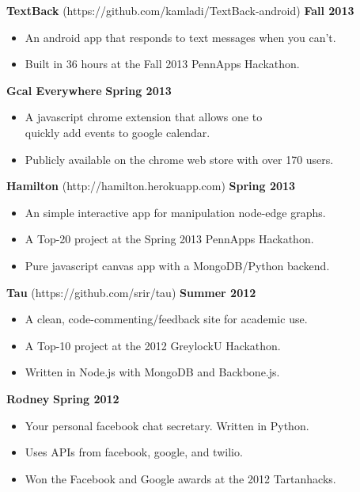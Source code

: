 \documentclass[sectioned]{dsyangres}
\begin{document}
\begin{resume}
\textbf{TextBack} (https://github.com/kamladi/TextBack-android)
\hfill \textbf{Fall 2013}
  \begin{itemize} \itemsep -2pt
    \item An android app that responds to text messages when you can't.
    \item Built in 36 hours at the Fall 2013 PennApps Hackathon.
  \end{itemize}

\textbf{Gcal Everywhere}
\hfill \textbf{Spring 2013}
  \begin{itemize} \itemsep -2pt
    \item A javascript chrome extension that allows one to \\
      quickly add events to google calendar.
    \item Publicly available on the chrome web store with over 170 users.
  \end{itemize}

\textbf{Hamilton} (http://hamilton.herokuapp.com)
\hfill \textbf{Spring 2013}
  \begin{itemize} \itemsep -2pt
    \item An simple interactive app for manipulation node-edge graphs.
    \item A Top-20 project at the Spring 2013 PennApps Hackathon.
    \item Pure javascript canvas app with a MongoDB/Python backend.
  \end{itemize}

\textbf{Tau} (https://github.com/srir/tau)
\hfill \textbf{Summer 2012}
  \begin{itemize} \itemsep -2pt
    \item A clean, code-commenting/feedback site for academic use.
    \item A Top-10 project at the 2012 GreylockU Hackathon.
    \item Written in Node.js with MongoDB and Backbone.js.
  \end{itemize}

 \textbf{Rodney}
 \hfill \textbf{Spring 2012}
   \begin{itemize} \itemsep -2pt
     \item Your personal facebook chat secretary. Written in Python.
     \item Uses APIs from facebook, google, and twilio.
     \item Won the Facebook and Google awards at the 2012 Tartanhacks.
   \end{itemize}


\end{resume}
\end{document}
